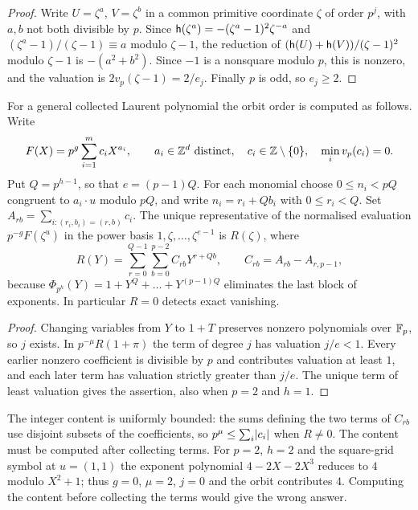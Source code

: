 \begin{proof}
Write $U=\zeta^a$, $V=\zeta^b$ in a common primitive coordinate $\zeta$ of
order $p^j$, with $a,b$ not both divisible by $p$. Since
$\mathsf{h}(\zeta^a)=-(\zeta^a-1)^2\zeta^{-a}$ and
$(\zeta^a-1)/(\zeta-1)\equiv a$ modulo $\zeta-1$, the reduction of
$(\mathsf{h}(U)+\mathsf{h}(V))/(\zeta-1)^2$ modulo $\zeta-1$ is $-(a^2+b^2)$. Since
$-1$ is a nonsquare modulo $p$, this is nonzero, and the valuation is
$2v_p(\zeta-1)=2/e_j$. Finally $p$ is odd, so $e_j\ge2$.
\end{proof}

For a general collected Laurent polynomial the orbit order is computed as
follows. Write
\begin{equation}\label{gra:eq:laurent}
 F(X)=p^g\sum_{i=1}^m c_iX^{a_i},\qquad a_i\in\mathbb{Z}^d\text{ distinct},\quad
 c_i\in\mathbb{Z}\setminus\{0\},\quad \min_iv_p(c_i)=0 .
\end{equation}
Put $Q=p^{h-1}$, so that $e=(p-1)Q$. For each monomial choose
$0\le n_i<pQ$ congruent to $a_i\cdot u$ modulo $pQ$, and write
$n_i=r_i+Qb_i$ with $0\le r_i<Q$. Set
$A_{rb}=\sum_{i:(r_i,b_i)=(r,b)}c_i$. The unique representative of the
normalised evaluation $p^{-g}F(\zeta^u)$ in the power basis
$1,\zeta,\dots,\zeta^{e-1}$ is $R(\zeta)$, where
\[
 R(Y)=\sum_{r=0}^{Q-1}\sum_{b=0}^{p-2}C_{rb}Y^{r+Qb},\qquad
 C_{rb}=A_{rb}-A_{r,p-1},
\]
because $\Phi_{p^h}(Y)=1+Y^Q+\dots+Y^{(p-1)Q}$ eliminates the last block of
exponents. In particular $R=0$ detects exact vanishing.


\begin{proof}
Changing variables from $Y$ to $1+T$ preserves nonzero polynomials over
$\mathbb{F}_p$, so $j$ exists. In $p^{-\mu}R(1+\pi)$ the term of degree $j$ has
valuation $j/e<1$. Every earlier nonzero coefficient is divisible by $p$
and contributes valuation at least $1$, and each later term has valuation
strictly greater than $j/e$. The unique term of least valuation gives the
assertion, also when $p=2$ and $h=1$.
\end{proof}

The integer content is uniformly bounded: the sums defining the two terms
of $C_{rb}$ use disjoint subsets of the coefficients, so
$p^\mu\le\sum_i\lvert c_i\rvert$ when $R\ne0$. The content must be computed after
collecting terms. For $p=2$, $h=2$ and the square-grid symbol at $u=(1,1)$
the exponent polynomial $4-2X-2X^3$ reduces to $4$ modulo $X^2+1$; thus
$g=0$, $\mu=2$, $j=0$ and the orbit contributes $4$. Computing the content
before collecting the terms would give the wrong answer.

